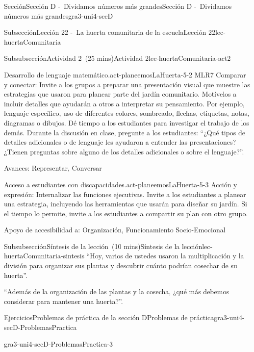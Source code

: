 \documentclass[oneside,10pt,]{article}
\begin{document}
\begin{sectionptx}{Sección}{Sección D -~Dividamos números más grandes}{}{Sección D -~Dividamos números más grandes}{}{}{gra3-uni4-secD}
\begin{subsectionptx}{Subsección}{Lección 22 -~La huerta comunitaria de la escuela}{}{Lección 22}{}{}{lec-huertaComunitaria}
\begin{subsubsectionptx}{Subsubsección}{Actividad 2~(25 mins)}{}{Actividad 2}{}{}{lec-huertaComunitaria-act2}
\begin{paragraphs}{Desarrollo de lenguaje matemático.}{act-planeemosLaHuerta-5-2}
MLR7 Comparar y conectar: Invite a los grupos a preparar una presentación visual que muestre las estrategias que usaron para planear parte del jardín comunitario. Motívelos a incluir detalles que ayudarán a otros a interpretar su pensamiento. Por ejemplo, lenguaje específico, uso de diferentes colores, sombreado, flechas, etiquetas, notas, diagramas o dibujos. Dé tiempo a los estudiantes para investigar el trabajo de los demás. Durante la discusión en clase, pregunte a los estudiantes: ``¿Qué tipos de detalles adicionales o de lenguaje les ayudaron a entender las presentaciones? ¿Tienen preguntas sobre alguno de los detalles adicionales o sobre el lenguaje?''.%
\par
Avances: Representar, Conversar%
\end{paragraphs}%
\begin{paragraphs}{Acceso a estudiantes con discapacidades.}{act-planeemosLaHuerta-5-3}%
Acción y expresión: Internalizar las funciones ejecutivas. Invite a los estudiantes a planear una estrategia, incluyendo las herramientas que usarán para diseñar su jardín. Si el tiempo lo permite, invite a los estudiantes a compartir su plan con otro grupo.%
\par
Apoyo de accesibilidad a: Organización, Funcionamiento Socio-Emocional%
\end{paragraphs}%
\end{subsubsectionptx}
%
%
\typeout{************************************************}
\typeout{************************************************}
%
\begin{subsubsectionptx}{Subsubsección}{Síntesis de la lección~(10 mins)}{}{Síntesis de la lección}{}{}{lec-huertaComunitaria-sintesis}
``Hoy, varios de ustedes usaron la multiplicación y la división para organizar sus plantas y descubrir cuánto podrían cosechar de su huerta''.%
\par
``Además de la organización de las plantas y la cosecha, ¿qué más debemos considerar para mantener una huerta?''.%
\end{subsubsectionptx}
\end{subsectionptx}
%
%
\typeout{************************************************}
\typeout{************************************************}
%
\begin{exercises-subsection}{Ejercicios}{Problemas de práctica de la sección D}{}{Problemas de práctica}{}{}{gra3-uni4-secD-ProblemasPractica}
\begin{divisionexercise}{1}{}{}{gra3-uni4-secD-ProblemasPractica-3}%

\end{divisionexercise}
\end{exercises-subsection}
\end{sectionptx}
\end{document}
